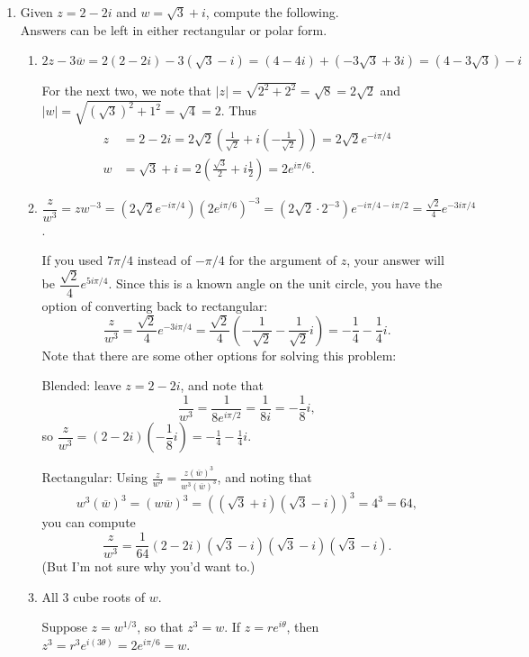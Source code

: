 \documentclass[12pt]{article}
\newcommand{\abs}[1]{\lvert #1\rvert}
\begin{document}
  \begin{enumerate}
    \item Given $z=2-2i$ and $w=\sqrt{3}+i$, compute the following.\\ Answers can be left in either rectangular or polar form.
    \begin{enumerate}
	\item $2z-3\overline{w} = 2(2-2i)-3(\sqrt{3}-i)=(4-4i)+(-3\sqrt{3}+3i)=(4-3\sqrt{3})-i$
	
	For the next two, we note that $\abs{z}=\sqrt{2^2+2^2}=\sqrt{8}=2\sqrt{2}$ and $\abs{w}=\sqrt{(\sqrt{3})^2+1^2} = \sqrt{4}=2$. Thus
	\begin{align*}
	z &= 2-2i=2\sqrt{2}\left(\frac{1}{\sqrt{2}}+i\left(-\frac{1}{\sqrt{2}}\right)\right)=2\sqrt{2}e^{-i\pi/4}\\
	w &= \sqrt{3}+i=2\left(\frac{\sqrt{3}}{2}+i\frac{1}{2}\right) = 2e^{i\pi/6}.
	\end{align*}
	
       
    \item $\dfrac{z}{w^3}=zw^{-3}=(2\sqrt{2}e^{-i\pi/4})(2e^{i\pi/6})^{-3}=(2\sqrt{2}\cdot 2^{-3})e^{-i\pi/4-i\pi/2} = \frac{\sqrt{2}}{4}e^{-3i\pi/4}$.
    
   If you used $7\pi/4$ instead of $-\pi/4$ for the argument of $z$, your answer will be $\dfrac{\sqrt{2}}{4}e^{5i\pi/4}$. Since this is a known angle on the unit circle, you have the option of converting back to rectangular:
\[
\frac{z}{w^3}=\frac{\sqrt{2}}{4}e^{-3i\pi/4}=\frac{\sqrt{2}}{4}\left(-\frac{1}{\sqrt{2}}-\frac{1}{\sqrt{2}}i\right)=-\frac14-\frac14 i.
\]
   Note that there are some other options for solving this problem:
   
   Blended: leave $z=2-2i$, and note that
   \[
   \frac{1}{w^3} = \frac{1}{8e^{i\pi/2}}=\frac{1}{8i}=-\frac{1}{8}i,
   \]
   so $\dfrac{z}{w^3}=(2-2i)\left(-\dfrac{1}{8}i\right)=-\frac14-\frac14 i$.
   
   Rectangular: Using $\frac{z}{w^3}=\frac{z(\overline{w})^3}{w^3(\overline{w})^3}$, and noting that
   \[
   w^3(\overline{w})^3=(w\overline{w})^3=((\sqrt{3}+i)(\sqrt{3}-i))^3=4^3=64,
   \]
   you can compute
   \[
   \frac{z}{w^3}=\frac{1}{64}(2-2i)(\sqrt{3}-i)(\sqrt{3}-i)(\sqrt{3}-i).
   \]
   (But I'm not sure why you'd want to.)
    
    \item All 3 cube roots of $w$.
    
    Suppose $z=w^{1/3}$, so that $z^3=w$. If $z=re^{i\theta}$, then $z^3=r^3e^{i(3\theta)}=2e^{i\pi/6} = w$.
    

\end{enumerate}
\end{enumerate}
\end{document}

